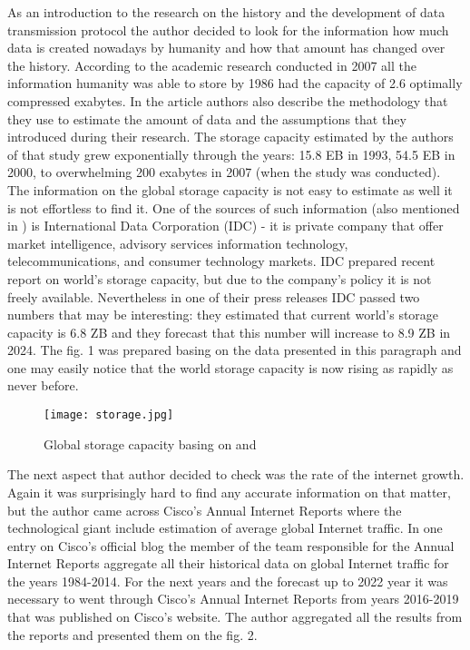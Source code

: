 \documentclass[magisterska,en]{pracamgr}
\begin{document}
\newpage
As an introduction to the research on the history and the development of data transmission protocol the author decided to look for the information how much data is created nowadays by humanity and how that amount has changed over the history. According to the academic research conducted in 2007 all the information humanity was able to store by 1986 had the capacity of 2.6 optimally compressed exabytes. In the article authors also describe the methodology that they use to estimate the amount of data and the assumptions that they introduced during their research. The storage capacity estimated by the authors of that study grew exponentially through the years: 15.8 EB in 1993, 54.5 EB in 2000, to overwhelming 200 exabytes in 2007 (when the study was conducted). \cite{Storage_study1} The information on the global storage capacity is not easy to estimate as well it is not effortless to find it. One of the sources of such information (also mentioned in \cite{Storage_study1}) is International Data Corporation (IDC) - it is private company that offer market intelligence, advisory services information technology, telecommunications, and consumer technology markets. \cite{IDC_about} IDC prepared recent report on world's storage capacity, but due to the company's policy it is not freely available. Nevertheless in one of their press releases IDC passed two numbers that may be interesting: they estimated that current world's storage capacity is 6.8 ZB and they forecast that this number will increase to 8.9 ZB in 2024. \cite{IDC_press} The fig. 1 was prepared basing on the data presented in this paragraph and one may easily notice that the world storage capacity is now rising as rapidly as never before.

\begin{figure}[h]
    \centering
    \texttt{[image: storage.jpg]}
    \caption{Global storage capacity basing on \cite{Storage_study1} and \cite{IDC_press}}
    \label{fig:storage}
\end{figure}

The next aspect that author decided to check was the rate of the internet growth. Again it was surprisingly hard to find any accurate information on that matter, but the author came across Cisco's Annual Internet Reports where the technological giant include estimation of average global Internet traffic. In one entry on Cisco's official blog the member of the team responsible for the Annual Internet Reports aggregate all their historical data on global Internet traffic for the years 1984-2014. \cite{Cisco_blog} For the next years and the forecast up to 2022 year it was necessary to went through Cisco's Annual Internet Reports from years 2016-2019 that was published on Cisco's website. \cite{Cisco_VNI} The author aggregated all the results from the reports and presented them on the fig. 2.
\end{document}
